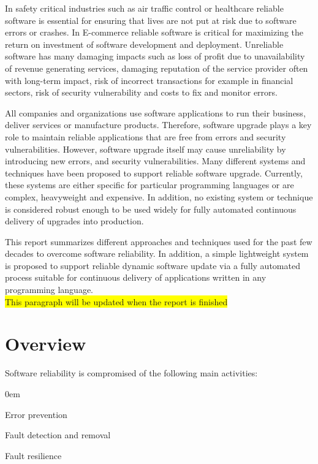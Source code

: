 \documentclass[a4paper,11pt,twoside]{article}
\begin{document}
In safety critical industries such as air traffic control or healthcare reliable software is essential for ensuring that lives are not put at risk due to software errors or crashes. In E-commerce reliable software is critical for maximizing the return on investment of software development and deployment. Unreliable software has many damaging impacts such as loss of profit due to unavailability of revenue generating services, damaging reputation of the service provider often with long-term impact, risk of incorrect transactions for example in financial sectors, risk of security vulnerability and costs to fix and monitor errors.

All companies and organizations use software applications to run their business, deliver services or manufacture products. Therefore, software upgrade plays a key role to maintain reliable applications that are free from errors and security vulnerabilities. However, software upgrade itself may cause unreliability by introducing new errors, and security vulnerabilities. Many different systems and techniques have been proposed to support reliable software upgrade. Currently, these systems are either specific for particular programming languages or are complex, heavyweight and expensive. In addition, no existing system or technique is considered robust enough to be used widely for fully automated continuous delivery of upgrades into production.
 
{\color{red}This report summarizes different approaches and techniques used for the past few decades to overcome software reliability. In addition, a simple lightweight system is proposed to support reliable dynamic software update via a fully automated process suitable for continuous delivery of applications written in any programming language.}\\  
\colorbox{yellow}{This paragraph will be updated when the report is finished}

\clearpage
\section{Overview}
Software reliability is compromised of the following main activities:

  \begin{list}{-}{}
  \itemsep0em
  \item Error prevention 
  
  \item Fault detection and removal
  
  \item Fault resilience
  \end{list}
\end{document}
